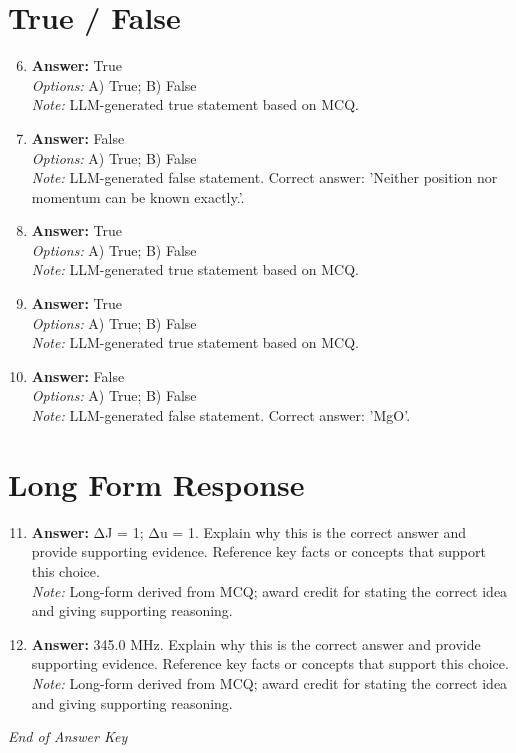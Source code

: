 \documentclass[12pt]{article}
\begin{document}
\section*{True / False}
\begin{enumerate}[label=\arabic*.]
\setcounter{enumi}{5}
\item \textbf{Answer:} True
\\ \textit{Options:} A) True; B) False
\\ \textit{Note:} LLM-generated true statement based on MCQ.
\item \textbf{Answer:} False
\\ \textit{Options:} A) True; B) False
\\ \textit{Note:} LLM-generated false statement. Correct answer: 'Neither position nor momentum can be known exactly.'.
\item \textbf{Answer:} True
\\ \textit{Options:} A) True; B) False
\\ \textit{Note:} LLM-generated true statement based on MCQ.
\item \textbf{Answer:} True
\\ \textit{Options:} A) True; B) False
\\ \textit{Note:} LLM-generated true statement based on MCQ.
\item \textbf{Answer:} False
\\ \textit{Options:} A) True; B) False
\\ \textit{Note:} LLM-generated false statement. Correct answer: 'MgO'.
\end{enumerate}

\section*{Long Form Response}
\begin{enumerate}[label=\arabic*.]
\setcounter{enumi}{10}
\item \textbf{Answer:} ΔJ = 1; Δu = 1. Explain why this is the correct answer and provide supporting evidence. Reference key facts or concepts that support this choice.
\\ \textit{Note:} Long-form derived from MCQ; award credit for stating the correct idea and giving supporting reasoning.
\item \textbf{Answer:} 345.0 MHz. Explain why this is the correct answer and provide supporting evidence. Reference key facts or concepts that support this choice.
\\ \textit{Note:} Long-form derived from MCQ; award credit for stating the correct idea and giving supporting reasoning.
\end{enumerate}

\vfill
\noindent\textit{End of Answer Key}
\end{document}
